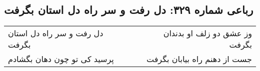 \begin{center}
\section*{رباعی شماره ۳۲۹: دل رفت و سر راه دل استان بگرفت}
\label{sec:0329}
\begin{longtable}{l p{0.5cm} r}
دل رفت و سر راه دل استان بگرفت
&&
وز عشق دو زلف او بدندان بگرفت
\\
پرسید کی تو چون دهان بگشادم
&&
جست از دهنم راه بیابان بگرفت
\\
\end{longtable}
\end{center}
